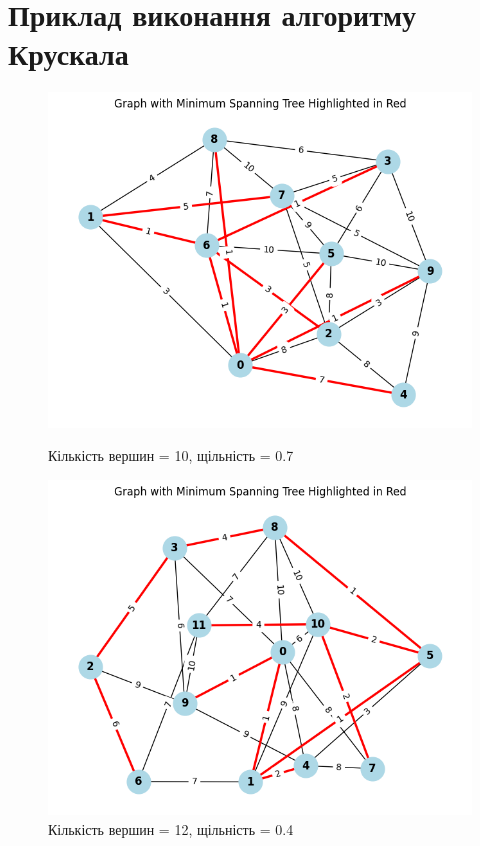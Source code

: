 \documentclass{article}
\begin{document}
\section{Приклад виконання алгоритму Крускала}
\begin{figure}[ht]
    \centering
    \begin{minipage}{0.45\textwidth}
        \centering
        \includegraphics[width=\textwidth]{img/example1.png}
        \caption{Кількість вершин = 10, щільність = 0.7}
    \end{minipage}
    \hfill
    \begin{minipage}{0.45\textwidth}
        \centering
        \includegraphics[width=\textwidth]{img/example2.png}
        \caption{Кількість вершин = 12, щільність = 0.4}
    \end{minipage}
\end{figure}
\end{document}
